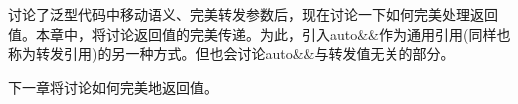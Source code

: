 讨论了泛型代码中移动语义、完美转发参数后，现在讨论一下如何完美处理返回值。本章中，将讨论返回值的完美传递。为此，引入auto\&\&作为通用引用(同样也称为转发引用)的另一种方式。但也会讨论auto\&\&与转发值无关的部分。

下一章将讨论如何完美地返回值。